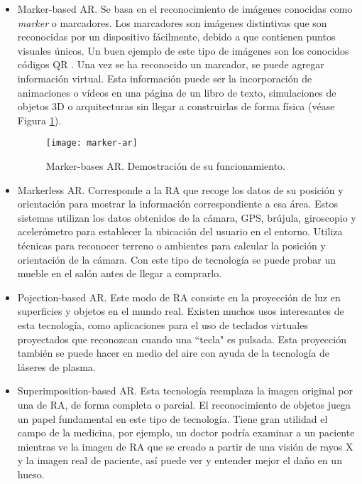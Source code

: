 \begin{itemize}
    \item 
    Marker-based AR. Se basa en el reconocimiento de imágenes conocidas como \textit{marker} o marcadores. Los marcadores son imágenes distintivas que son reconocidas por un dispositivo fácilmente, debido a que contienen puntos visuales únicos. Un buen ejemplo de este tipo de imágenes son los conocidos códigos QR \cite{URL::CodigoQR}. Una vez se ha reconocido un marcador, se puede agregar información virtual. Esta información puede ser la incorporación de animaciones o vídeos en una página de un libro de texto, simulaciones de objetos 3D o arquitecturas sin llegar a construirlas de forma física (véase Figura \ref{fig:markerAR}).
    \begin{figure}[h]
        \centering
        \texttt{[image: marker-ar]}
        \caption{Marker-bases AR. Demostración de su funcionamiento.}
        \label{fig:markerAR}
    \end{figure}

   

    \item Markerless AR. Corresponde a la RA que recoge los datos de su posición y orientación para mostrar la información correspondiente a esa área. Estos sistemas utilizan los datos obtenidos de la cámara, GPS, brújula, giroscopio y acelerómetro para establecer la ubicación del usuario en el entorno. Utiliza técnicas para reconocer terreno o ambientes para calcular la posición y orientación de la cámara. Con este tipo de tecnología se puede probar un mueble en el salón antes de llegar a comprarlo.

 
    \item Pojection-based AR. Este modo de RA consiste en la proyección de luz en superficies y objetos en el mundo real. Existen muchos usos interesantes de esta tecnología, como aplicaciones para el uso de teclados virtuales proyectados que reconozcan cuando una ``tecla" es pulsada. Esta proyección también se puede hacer en medio del aire con ayuda de la tecnología de láseres de plasma.

    \item Superimposition-based AR. Esta tecnología reemplaza la imagen original por una de RA, de forma completa o parcial. El reconocimiento de objetos juega un papel fundamental en este tipo de tecnología. Tiene gran utilidad el campo de la medicina, por ejemplo, un doctor podría examinar a un paciente mientras ve la imagen de RA que se creado a partir de una visión de rayos X y la imagen real de paciente, así puede ver y entender mejor el daño en un hueso.
\end{itemize} 


